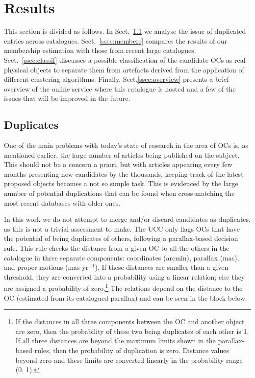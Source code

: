 \documentclass[fleqn,usenatbib]{mnras}
\begin{document}
\section{Results}
\label{sec:results}

This section is divided as follows. In Sect.~\ref{ssec:duplicates} we analyse
the issue of duplicated entries across catalogues. Sect.~\ref{ssec:members}
compares the results of our membership estimation with those from recent
large catalogues. Sect.~\ref{ssec:classif} discusses a possible
classification of the candidate OCs as real physical objects to separate them
from artefacts derived from the application of different clustering algorithms.
Finally, Sect.\ref{ssec:overview} presents a brief overview of the online
service where this catalogue is hosted and a few of the issues that will be
improved in the future.


\subsection{Duplicates}
\label{ssec:duplicates}

One of the main problems with today's state of research in the area of OCs is,
as mentioned earlier, the large number of articles being published on the subject.
This should not be a concern a priori, but with articles appearing every few
months presenting new candidates by the thousands, keeping track of the
latest proposed objects becomes a not so simple task.
This is evidenced by the large number of potential duplications that can be
found when cross-matching the most recent databases with older ones.

In this work we do not attempt to merge and/or discard candidates as duplicates,
as this is not a trivial assessment to make. The UCC only flags OCs that have
the potential of being duplicates of others, following a parallax-based
decision rule. This rule checks the distance from a given OC to all the others
in the catalogue in three separate components: coordinates (arcmin), parallax 
(mas), and proper motions (mas yr$^{-1}$). If these distances are smaller than a
given threshold, they are converted into a probability using a linear relation;
else they are assigned a probability of zero.\footnote{If the distances in all
three components between the OC and another object are zero, then the
probability of these two being duplicates of each other is 1. If all three
distances are beyond the maximum limits shown in the parallax-based rules, then
the probability of duplication is zero. Distance values beyond zero and these
limits are converted linearly in the probability range (0, 1).}
The relations depend on the distance to the OC (estimated
from its catalogued parallax) and can be seen in the block below.
\end{document}
